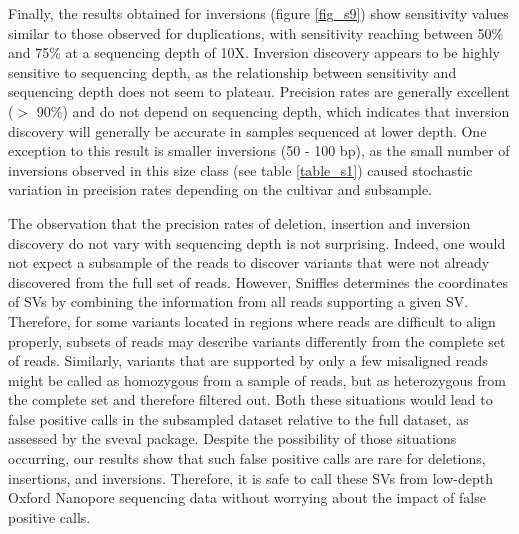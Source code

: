 \documentclass[12pt]{article}
\begin{document}
Finally, the results obtained for inversions (figure \ref{fig_s9}) show sensitivity values similar to those observed for duplications, with sensitivity reaching between 50\% and 75\% at a sequencing depth of 10X.
Inversion discovery appears to be highly sensitive to sequencing depth, as the relationship between sensitivity and sequencing depth does not seem to plateau.
Precision rates are generally excellent ($>$ 90\%) and do not depend on sequencing depth, which indicates that inversion discovery will generally be accurate in samples sequenced at lower depth.
One exception to this result is smaller inversions (50 - 100 bp), as the small number of inversions observed in this size class (see table \ref{table_s1}) caused stochastic variation in precision rates depending on the cultivar and subsample.

The observation that the precision rates of deletion, insertion and inversion discovery do not vary with sequencing depth is not surprising.
Indeed, one would not expect a subsample of the reads to discover variants that were not already discovered from the full set of reads.
However, Sniffles determines the coordinates of SVs by combining the information from all reads supporting a given SV.
Therefore, for some variants located in regions where reads are difficult to align properly, subsets of reads may describe variants differently from the complete set of reads.
Similarly, variants that are supported by only a few misaligned reads might be called as homozygous from a sample of reads, but as heterozygous from the complete set and therefore filtered out.
Both these situations would lead to false positive calls in the subsampled dataset relative to the full dataset, as assessed by the sveval package.
Despite the possibility of those situations occurring, our results show that such false positive calls are rare for deletions, insertions, and inversions.
Therefore, it is safe to call these SVs from low-depth Oxford Nanopore sequencing data without worrying about the impact of false positive calls.

\end{document}
